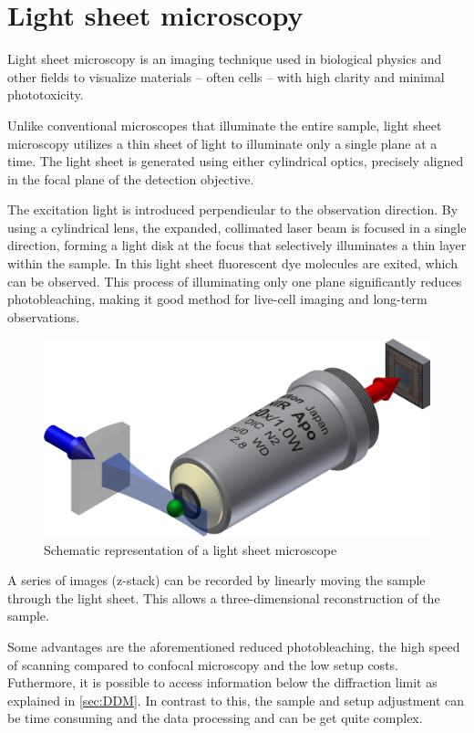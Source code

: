 \section{Light sheet microscopy} 

Light sheet microscopy is an imaging technique used in biological physics and other fields to visualize materials -- often cells -- with high clarity and minimal phototoxicity.

Unlike conventional microscopes that illuminate the entire sample, light sheet microscopy utilizes a thin sheet of light to illuminate only a single plane at a time. 
The light sheet is generated using either cylindrical optics, precisely aligned in the focal plane of the detection objective. 

The excitation light is introduced perpendicular to the observation direction. By using a cylindrical 
lens, the expanded, collimated laser beam is focused in a single direction, forming a light disk 
at the focus that selectively illuminates a thin layer within the sample. In this light sheet
fluorescent dye molecules are exited, which can be observed. This process of illuminating only one plane significantly reduces photobleaching, making it good method for live-cell imaging and long-term observations. 

\begin{figure}[ht]
    \centering
    \includegraphics[width = 12cm]{Bilder/Theory/LSM.png}
    \caption[]{Schematic representation of a light sheet microscope\footnotemark}
    \label{fig:LSM}
\end{figure}

A series of images (z-stack) can be recorded by linearly moving the sample through the light sheet. This allows a three-dimensional reconstruction of the sample. 


Some advantages are the aforementioned reduced photobleaching, the high speed of scanning compared to confocal microscopy and the low setup costs. Futhermore, it is possible to 
access information below the diffraction limit as explained in \cref{sec:DDM}.
In contrast to this, the sample and setup adjustment can be time consuming and the data processing and 
can be get quite complex.  

